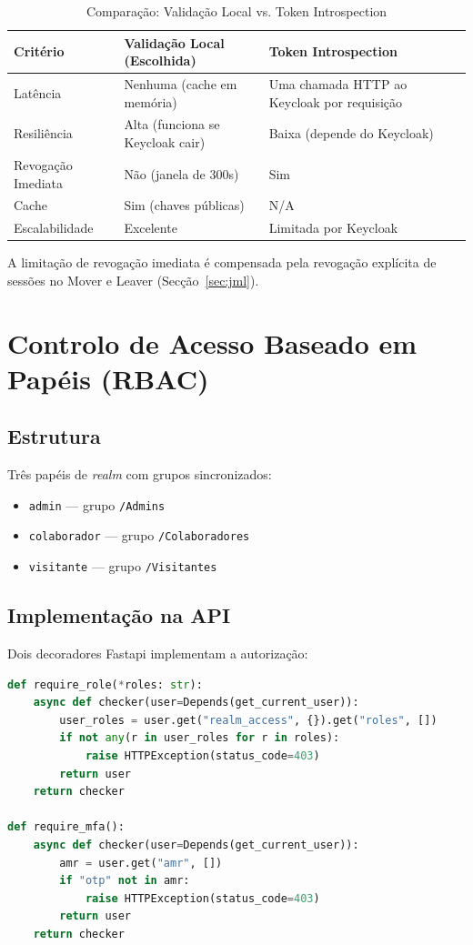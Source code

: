 \begin{table}[h!]
\centering
\caption{Comparação: Validação Local vs. Token Introspection}
\label{tab:validacao}
\begin{tabularx}{\textwidth}{|l|X|X|}
\hline
\textbf{Critério} & \textbf{Validação Local (Escolhida)} & \textbf{Token Introspection} \\ \hline
Latência & Nenhuma (cache em memória) & Uma chamada HTTP ao Keycloak por requisição \\ \hline
Resiliência & Alta (funciona se Keycloak cair) & Baixa (depende do Keycloak) \\ \hline
Revogação Imediata & Não (janela de 300s) & Sim \\ \hline
Cache & Sim (chaves públicas) & N/A \\ \hline
Escalabilidade & Excelente & Limitada por Keycloak \\ \hline
\end{tabularx}
\end{table}

A limitação de revogação imediata é compensada pela revogação explícita de sessões no Mover e Leaver (Secção~\ref{sec:jml}).

\section{Controlo de Acesso Baseado em Papéis (RBAC)}

\subsection{Estrutura}

Três papéis de \textit{realm} com grupos sincronizados:
\begin{itemize}
  \item \texttt{admin} — grupo \texttt{/Admins}
  \item \texttt{colaborador} — grupo \texttt{/Colaboradores}
  \item \texttt{visitante} — grupo \texttt{/Visitantes}
\end{itemize}

\subsection{Implementação na API}

Dois decoradores Fastapi implementam a autorização:

\begin{lstlisting}[language=Python, caption={Dependências require\_role() e require\_mfa() em auth.py},label={lst:rbac}]
def require_role(*roles: str):
    async def checker(user=Depends(get_current_user)):
        user_roles = user.get("realm_access", {}).get("roles", [])
        if not any(r in user_roles for r in roles):
            raise HTTPException(status_code=403)
        return user
    return checker

def require_mfa():
    async def checker(user=Depends(get_current_user)):
        amr = user.get("amr", [])
        if "otp" not in amr:
            raise HTTPException(status_code=403)
        return user
    return checker
\end{lstlisting}

